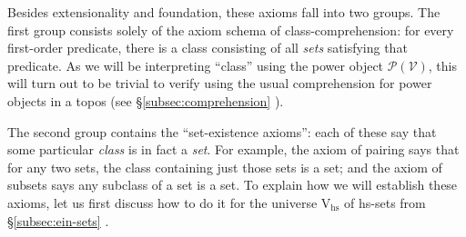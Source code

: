 \documentclass{amsart}
\newcommand\cV{\mathcal{V}}
\newcommand\hs{\mathrm{hs}}
\newcommand\pow{\mathcal{P}}
\newcommand\rV{\mathrm{V}}
\newcommand\prerefpost[3]{%
  \texorpdfstring%
    {\hyperref[#2]{#1\ref*{#2}#3}}%
    {#1\ref*{#2}#3}%
}
\newcommand\sref[1]{\prerefpost{\S}{#1}{}}
\theoremstyle{definition}
\theoremstyle{remark}
\theoremstyle{plainwithref}
\begin{document}
Besides extensionality and foundation, these axioms fall into two groups.
The first group consists solely of the axiom schema of class-comprehension: for every first-order predicate, there is a class consisting of all \emph{sets} satisfying that predicate.
As we will be interpreting ``class'' using the power object \( \pow(\cV) \), this will turn out to be trivial to verify using the usual comprehension for power objects in a topos (see \sref{subsec:comprehension}).

The second group contains the ``set-existence axioms'': each of these say that some particular \emph{class} is in fact a \emph{set}.
For example, the axiom of pairing says that for any two sets, the class containing just those sets is a set; and the axiom of subsets says any subclass of a set is a set.
To explain how we will establish these axioms, let us first discuss how to do it for the universe \( \rV_\hs \) of hs-sets from \sref{subsec:ein-sets}.
\end{document}

